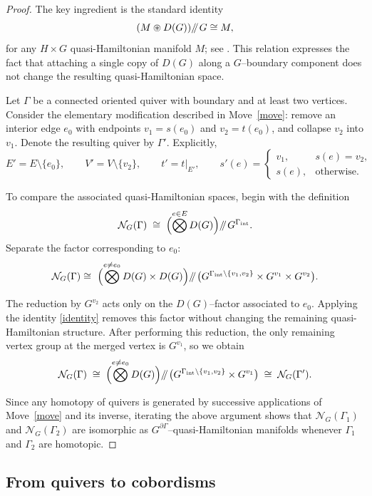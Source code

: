 \documentclass[reqno]{amsart}
\theoremstyle{plain}
\theoremstyle{definition}
\newcommand{\N}{\mathcal{N}}
\newcommand{\sll}[1]{\mkern-4mu\mathbin{/\mkern-5mu/}_{\mkern-4mu{#1}}}
\begin{document}
\begin{proof}
The key ingredient is the standard identity
\begin{equation}\label{identity}
    (M \circledast D(G))\sll{} G \cong M,
\end{equation}
for any $H \times G$ quasi-Hamiltonian manifold $M$; see
\cite[Example~9.1]{alekseev1998}.  This relation expresses the fact that attaching a single copy of $D(G)$ along a $G${--}boundary component does not change the resulting quasi-Hamiltonian space.

Let $\Gamma$ be a connected oriented quiver with boundary and at least two
vertices.  Consider the elementary modification described in Move~\ref{move}:
remove an interior edge $e_0$ with endpoints $v_1 = s(e_0)$ and
$v_2 = t(e_0)$, and collapse $v_2$ into $v_1$.  Denote the resulting quiver by
$\Gamma'$.  Explicitly,
\[
E' = E \setminus \{e_0\}, \qquad
V' = V \setminus \{v_2\}, \qquad
t' = t|_{E'}, \qquad
s'(e) =
\begin{cases}
v_1, & s(e)=v_2,\\[0.2em]
s(e), & \text{otherwise}.
\end{cases}
\]

To compare the associated quasi-Hamiltonian spaces, begin with the definition
\[
\N_G(\Gamma)
\;\cong\;
\Bigl(\bigotimes^{e\in E} D(G)\Bigr)\sll{} G^{\Gamma_{\mathrm{int}}}.
\]
Separate the factor corresponding to $e_0$:
\[
\N_G(\Gamma)
\cong\
\Bigl(\bigotimes^{e\neq e_0} D(G) \times D(G)\Bigr)
\sll{}
\bigl(G^{\Gamma_{\mathrm{int}}\setminus\{v_1,v_2\}}
      \times G^{v_1} \times G^{v_2}\bigr).
\]

The reduction by $G^{v_2}$ acts only on the $D(G)${--}factor associated to $e_0$.
Applying the identity \eqref{identity} removes this factor without changing the
remaining quasi-Hamiltonian structure.  After performing this reduction, the
only remaining vertex group at the merged vertex is $G^{v_1}$, so we obtain
\[
\N_G(\Gamma)
\;\cong\;
\Bigl(\bigotimes^{e\neq e_0} D(G)\Bigr)
\sll{}
\bigl(G^{\Gamma_{\mathrm{int}}\setminus\{v_1,v_2\}} \times G^{v_1}\bigr)
\;\cong\;
\N_G(\Gamma').
\]

Since any homotopy of quivers is generated by successive applications of
Move~\ref{move} and its inverse, iterating the above argument shows that
$\N_G(\Gamma_1)$ and $\N_G(\Gamma_2)$ are isomorphic as
$G^{\partial\Gamma}${--}quasi-Hamiltonian manifolds whenever
$\Gamma_1$ and $\Gamma_2$ are homotopic. 
\end{proof}

\subsection{From quivers to cobordisms}
\end{document}
